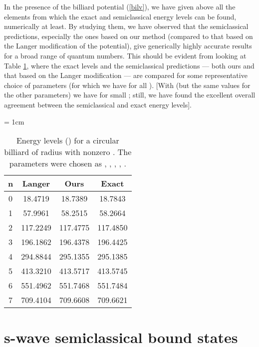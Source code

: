 \documentclass[a4paper,aps,eqsecnum,preprint,preprintnumbers,12pt]{revtex4}
\begin{document}
In the presence of the billiard potential (\ref{bilv}), we have
given above all the elements from which the exact and
semiclassical energy levels can be found, numerically at least. By
studying them, we have observed that the semiclassical
predictions, especially the ones based on our method (compared to
that based on the Langer modification of the potential), give
generically highly accurate results for a broad range of quantum
numbers. This should be evident from looking at Table \ref{tab1},
where the exact levels and the semiclassical predictions --- both
ours and that based on the Langer modification --- are compared
for some representative choice of parameters (for which we have
\coordHE{} for all \coordHE{}). [With \coordHE{} (but the
same values for the other parameters) we have \coordHE{} for small
\coordHE{}; still, we have found the excellent overall agreement between
the semiclassical and exact energy levels].
\begin{table}[t]
\caption{Energy levels (\coordHE{}) for a circular billiard of radius
\coordHE{} with nonzero \coordHE{}. The parameters were chosen as \coordHE{}, \coordHE{}, \coordHE{},
\coordHE{}, \coordHE{}. \label{tab1}}
\begin{center}
\tabcolsep = 1cm
\begin{tabular}{c|ccc}
\hline \hline n & Langer & Ours & Exact \\ \hline
0 & 18.4719 & 18.7389 & 18.7843 \\
1 & 57.9961 & 58.2515 & 58.2664 \\
2 & 117.2249 & 117.4775 & 117.4850 \\
3 & 196.1862 & 196.4378 & 196.4425 \\
4 & 294.8844 & 295.1355 & 295.1385 \\
5 & 413.3210 & 413.5717 & 413.5745 \\
6 & 551.4962 & 551.7468 & 551.7484 \\
7 & 709.4104 & 709.6608 & 709.6621 \\ \hline \hline
\end{tabular}
\end{center}
\end{table}

\section{s-wave semiclassical bound states}
\end{document}
